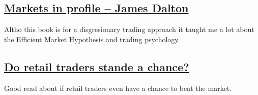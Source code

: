 \documentclass[12pt]{article}
\begin{document}
{\subsection{\href{https://www.r-5.org/files/books/trading/charts/market-profile/James_Dalton-Markets_in_Profile-EN.pdf}{Markets in profile -- James Dalton}}
Altho this book is for a disgresionary trading approach it taught me a lot about the Efficient Market Hypothesis and trading psychology.

\subsection{\href{https://x.com/i/grok/share/q9fAogSBPA92zR0lgXd4q9OZT}{Do retail traders stande a chance?}}

Good read about if retail traders even have a chance to beat the market.
}
\end{document}

